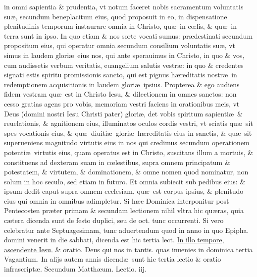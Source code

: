 \documentclass[a5paper,10pt]{book}
\def\leftmarginnote{%
	\lrmarginnote{\hskip -\marginparsep \hskip -6.5em}}
\def\ae{æ}
\def\oe{œ}
\begin{document}
\begin{multicols*}{2}
in\leftmarginnote{\begin{flushright}B\end{flushright}} omni sapientia \& prudentia, vt notum faceret nobis sacramentum voluntatis su\ae , secundum beneplacitum eius, quod proposuit in eo, in dispensatione plenitudinis temporum instaurare omnia in Christo, qu\ae \ in c\oe lis, \& qu\ae \ in terra sunt in ipso.
In quo etiam \& nos sorte vocati sumus: pr\ae destinati secundum propositum eius, qui operatur omnia secundum consilium voluntatis su\ae , vt simus in laudem glori\ae \ eius nos, qui ante sperauimus in Christo, in quo \& vos, cum audissetis verbum veritatis, euangelium salutis vestr\ae : in quo \& credentes signati estis spiritu promissionis sancto, qui est pignus h\ae reditatis nostr\ae \ in redemptionem acquisitionis in laudem glori\ae \ ipsius.
Propterea \& ego audiens fidem vestram qu\ae \ est in Christo Iesu, \& dilectionem in omnes sanctos: non cesso
gratias agens pro vobis, memoriam vestri faciens in orationibus meis, vt Deus (domini nostri Iesu Christi pater) glori\ae , det vobis spiritum sapienti\ae \ \& reuelationis, \& agnitionem eius, illuminatos oculos cordis vestri, vt sciatis qu\ae \ sit spes vocationis eius, \& qu\ae \ diuiti\ae \ glori\ae \ h\ae reditatis eius in sanctis, \& qu\ae \ sit superueniens magnitudo virtutis eius in nos qui credimus secundum operationem potenti\ae \ virtutis eius, quam operatus est in Christo, suscitans illum a mortuis, \& constituens ad dexteram suam in c\oe lestibus, supra omnem principatum \& potestatem, \& virtutem, \& dominationem, \& omne nomen quod nominatur, non solum in hoc seculo, sed etiam in futuro.
Et omnia subiecit sub pedibus eius: \& ipsum dedit caput supra omnem ecclesiam, qu\ae \ est corpus ipsius, \& plenitudo eius qui omnia in omnibus adimpletur.
\newline {} \color{red} Si h\ae c Dominica interponitur post Pentecosten pr\ae ter primam \& secundam lectionem nihil vltra hic qu\ae ras, quia c\ae tera dicenda sunt de festo duplici, seu de oct. tunc occurrenti. Si vero celebratur ante Septuagesimam, tunc aduertendum quod in anno in quo Epipha. domini venerit in die sabbati, dicenda est hic tertia lect. \color{black} \hyperlink{page.181}{In illo tempore, ascendente Iesu.} \color{red} \& oratio. \color{black} Deus qui nos in tantis. \color{red} quas inuenies in dominica tertia Vagantium. In alijs autem annis dicend\ae \ sunt hic tertia lectio \& oratio infrascript\ae . \color{black}
\newline \color{red} Secundum Matth\ae um. \hfill Lectio. iij. \color{black}

\end{multicols*}
\end{document}
